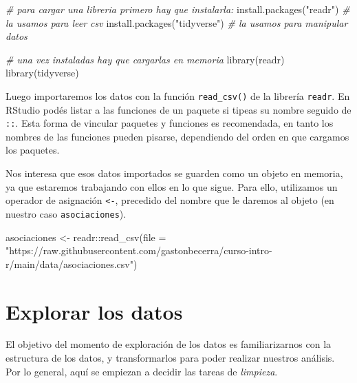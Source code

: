 \documentclass[
]{book}
\newenvironment{Shaded}{\begin{snugshade}}{\end{snugshade}}
\newcommand{\AttributeTok}[1]{\textcolor[rgb]{0.77,0.63,0.00}{#1}}
\newcommand{\CommentTok}[1]{\textcolor[rgb]{0.56,0.35,0.01}{\textit{#1}}}
\newcommand{\FunctionTok}[1]{\textcolor[rgb]{0.00,0.00,0.00}{#1}}
\newcommand{\NormalTok}[1]{#1}
\newcommand{\OtherTok}[1]{\textcolor[rgb]{0.56,0.35,0.01}{#1}}
\newcommand{\SpecialCharTok}[1]{\textcolor[rgb]{0.00,0.00,0.00}{#1}}
\newcommand{\StringTok}[1]{\textcolor[rgb]{0.31,0.60,0.02}{#1}}
\begin{document}
\begin{Shaded}
\begin{Highlighting}[]
\CommentTok{\# para cargar una libreria primero hay que instalarla:}
\FunctionTok{install.packages}\NormalTok{(}\StringTok{"readr"}\NormalTok{) }\CommentTok{\# la usamos para leer csv}
\FunctionTok{install.packages}\NormalTok{(}\StringTok{"tidyverse"}\NormalTok{) }\CommentTok{\# la usamos para manipular datos}
\end{Highlighting}
\end{Shaded}

\begin{Shaded}
\begin{Highlighting}[]
\CommentTok{\# una vez instaladas hay que cargarlas en memoria}
\FunctionTok{library}\NormalTok{(readr) }
\FunctionTok{library}\NormalTok{(tidyverse) }
\end{Highlighting}
\end{Shaded}

Luego importaremos los datos con la función \texttt{read\_csv()} de la librería \texttt{readr}. En RStudio podés listar a las funciones de un paquete si tipeas su nombre seguido de \texttt{::}. Esta forma de vincular paquetes y funciones es recomendada, en tanto los nombres de las funciones pueden pisarse, dependiendo del orden en que cargamos los paquetes.

Nos interesa que esos datos importados se guarden como un objeto en memoria, ya que estaremos trabajando con ellos en lo que sigue. Para ello, utilizamos un operador de asignación \texttt{\textless{}-}, precedido del nombre que le daremos al objeto (en nuestro caso \texttt{asociaciones}).

\begin{Shaded}
\begin{Highlighting}[]
\NormalTok{asociaciones }\OtherTok{\textless{}{-}}\NormalTok{ readr}\SpecialCharTok{::}\FunctionTok{read\_csv}\NormalTok{(}\AttributeTok{file =} \StringTok{"https://raw.githubusercontent.com/gastonbecerra/curso{-}intro{-}r/main/data/asociaciones.csv"}\NormalTok{)}
\end{Highlighting}
\end{Shaded}

\hypertarget{explorar-los-datos}{%
\section{Explorar los datos}\label{explorar-los-datos}}

El objetivo del momento de exploración de los datos es familiarizarnos con la estructura de los datos, y transformarlos para poder realizar nuestros análisis. Por lo general, aquí se empiezan a decidir las tareas de \emph{limpieza}.
\end{document}
